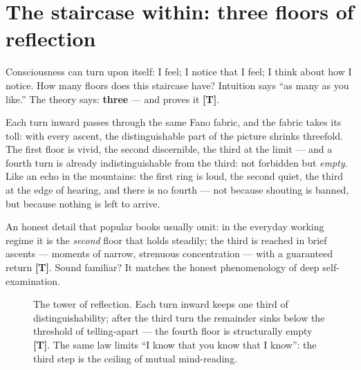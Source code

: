 \documentclass[11pt,letterpaper]{article}
\newcommand{\stT}{\textbf{[T]}\xspace}
\begin{document}
\section{The staircase within: three floors of reflection}
\label{sec:tower}

Consciousness can turn upon itself: I feel; I notice that I feel; I
think about how I notice. How many floors does this staircase have?
Intuition says ``as many as you like.'' The theory says:
\textbf{three} --- and proves it \stT.

Each turn inward passes through the same Fano fabric, and the fabric
takes its toll: with every ascent, the distinguishable part of the
picture shrinks threefold. The first floor is vivid, the second
discernible, the third at the limit --- and a fourth turn is already
indistinguishable from the third: not forbidden but \emph{empty}.
Like an echo in the mountains: the first ring is loud, the second
quiet, the third at the edge of hearing, and there is no fourth ---
not because shouting is banned, but because nothing is left to
arrive.

An honest detail that popular books usually omit: in the everyday
working regime it is the \emph{second} floor that holds steadily;
the third is reached in brief ascents --- moments of narrow,
strenuous concentration --- with a guaranteed return \stT. Sound
familiar? It matches the honest phenomenology of deep
self-examination.

\begin{figure}[H]
\centering
{}
\caption{The tower of reflection. Each turn inward keeps one third of
distinguishability; after the third turn the remainder sinks below
the threshold of telling-apart --- the fourth floor is structurally
empty \stT. The same law limits ``I know that you know that I
know'': the third step is the ceiling of mutual mind-reading.}
\label{fig:tower}
\end{figure}
\end{document}
